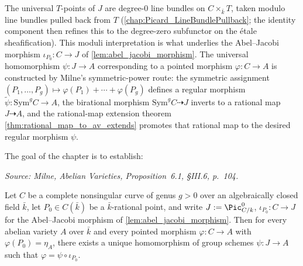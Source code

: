 The universal \(T\)-points of \(J\) are degree-\(0\) line bundles on \(C \times_{\bar k}
T\), taken modulo line bundles pulled back from \(T\) (\cref{chap:Picard_LineBundlePullback};
the identity component then refines this to the degree-zero subfunctor on the
\'etale sheafification). This moduli interpretation is what underlies the
Abel--Jacobi morphism \(\iota_{P_0} \colon C \to J\) of
\cref{lem:abel_jacobi_morphism}. The universal homomorphism \(\psi \colon J
\to A\) corresponding to a pointed morphism \(\varphi \colon C \to A\) is
constructed by Milne's symmetric-power route: the symmetric assignment
\((P_1, \ldots, P_g) \mapsto \varphi(P_1) + \cdots + \varphi(P_g)\) defines a
regular morphism \(\widetilde \psi \colon \mathrm{Sym}^g C \to A\), the
birational morphism \(\mathrm{Sym}^g C \dashrightarrow J\) inverts to a
rational map \(J \dashrightarrow A\), and the rational-map extension theorem
\cref{thm:rational_map_to_av_extends} promotes that rational map to the
desired regular morphism \(\psi\).

The goal of the chapter is to establish:

\begin{theorem}
  \label{thm:albanese_universal_property}

  \textit{Source: Milne, \emph{Abelian Varieties}, Proposition~6.1, \S III.6, p.~104.}

  Let \(C\) be a complete nonsingular curve of genus \(g > 0\) over an algebraically
  closed field \(\bar k\), let \(P_0 \in C(\bar k)\) be a \(\bar k\)-rational point,
  and write \(J := \Pic^0_{C/k}\), \(\iota_{P_0} \colon C \to J\) for the
  Abel--Jacobi morphism of \cref{lem:abel_jacobi_morphism}. Then for every
  abelian variety \(A\) over \(\bar k\) and every pointed morphism
  \(\varphi \colon C \to A\) with \(\varphi(P_0) = \eta_A\), there exists a unique
  homomorphism of group schemes \(\psi \colon J \to A\) such that
  \(\varphi = \psi \circ \iota_{P_0}\).
\end{theorem}

